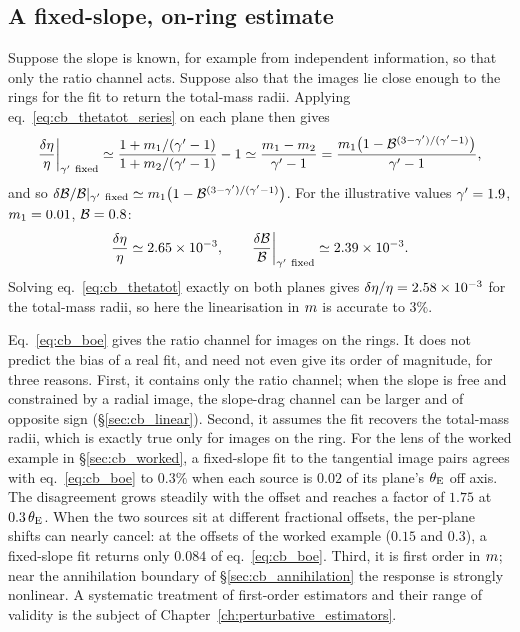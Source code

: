 \subsection{A fixed-slope, on-ring estimate}
\label{sec:cb_boe}

Suppose the slope is known, for example from independent
information, so that only the ratio channel acts. Suppose also that the
images lie close enough to the rings for the fit to return the
total-mass radii. Applying eq.~\eqref{eq:cb_thetatot_series} on each
plane then gives
\begin{equation}
  \frac{\delta\eta}{\eta}\bigg|_{\gamma'\ \rm fixed}
  \simeq \frac{1+m_1/(\gamma'-1)}{1+m_2/(\gamma'-1)} - 1
  \simeq \frac{m_1-m_2}{\gamma'-1}
  = \frac{m_1\big(1-\mathcal{B}^{(3-\gamma')/(\gamma'-1)}\big)}{\gamma'-1},
  \label{eq:cb_boe}
\end{equation}
and so
$\delta\mathcal{B}/\mathcal{B}|_{\gamma'\ \rm fixed}\simeq m_1\big(1-\mathcal{B}^{(3-\gamma')/(\gamma'-1)}\big)$.
For the illustrative values $\gamma'=1.9$, $m_1=0.01$, $\mathcal{B}=0.8$:
\begin{equation*}
  \frac{\delta\eta}{\eta}\simeq 2.65\times10^{-3},
  \qquad
  \frac{\delta\mathcal{B}}{\mathcal{B}}\bigg|_{\gamma'\ \rm fixed}\simeq 2.39\times10^{-3}.
\end{equation*}
Solving eq.~\eqref{eq:cb_thetatot} exactly on both planes gives
$\delta\eta/\eta = 2.58\times10^{-3}$ for the total-mass radii, so
here the linearisation in $m$ is accurate to $3\%$.

\begin{keybox}
Eq.~\eqref{eq:cb_boe} gives the ratio channel for images on the rings.
It does not predict the bias of a real fit, and need not even give its
order of magnitude, for three reasons. First, it contains only the
ratio channel; when the slope is free and constrained by a radial
image, the slope-drag channel can be larger and of opposite sign
(\S\ref{sec:cb_linear}). Second, it assumes the fit recovers the
total-mass radii, which is exactly true only for images on the ring.
For the lens of the worked example in \S\ref{sec:cb_worked}, a
fixed-slope fit to the tangential image pairs agrees with
eq.~\eqref{eq:cb_boe} to $0.3\%$ when each source is $0.02$ of its
plane's $\theta_{\mathrm{E}}$ off axis. The disagreement grows steadily with the
offset and reaches a factor of $1.75$ at $0.3\,\theta_{\mathrm{E}}$. When the two
sources sit at different fractional offsets, the per-plane shifts can
nearly cancel: at the offsets of the worked example ($0.15$ and
$0.3$), a fixed-slope fit returns only $0.084$ of
eq.~\eqref{eq:cb_boe}. Third, it is first order in $m$; near the
annihilation boundary of \S\ref{sec:cb_annihilation} the response is
strongly nonlinear.
A systematic treatment of first-order estimators and their range of
validity is the subject of Chapter~\ref{ch:perturbative_estimators}.
\end{keybox}



